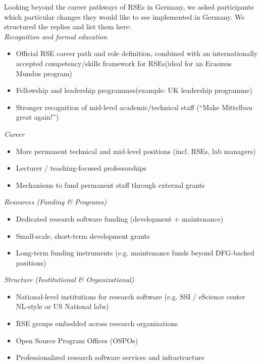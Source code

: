 \documentclass{eceasst}
\begin{document}
Looking beyond the career pathways of RSEs in Germany, we asked participants which particular changes they would like to see implemented in Germany.
We structured the replies and list them here:\\
\emph{Recognition and formal education}\\
\begin{itemize}
 \item Official RSE career path and role definition, combined with an internationally accepted competency/skills framework for RSEs(ideal for an Erasmus Mundus program)
\item Fellowship and leadership programmes(example: UK leadership programme)
\item Stronger recognition of mid-level academic/technical staff (“Make Mittelbau great again!”)
\end{itemize}
\emph{Career}\\
\begin{itemize}
 \item More permanent technical and mid-level positions (incl. RSEs, lab managers)
 \item Lecturer / teaching-focused professorships
 \item Mechanisms to fund permanent staff through external grants
\end{itemize}
\emph{Resources (Funding \& Programs)}\\
\begin{itemize}
 \item Dedicated research software funding (development + maintenance)
 \item Small-scale, short-term development grants
 \item Long-term funding instruments (e.g. maintenance funds beyond DFG-backed positions)
\end{itemize}
\emph{Structure (Institutional \& Organizational)}
\begin{itemize}
 \item National-level institutions for research software (e.g. SSI / eScience center NL-style or US National labs)
 \item RSE groups embedded across research organizations
 \item Open Source Program Offices (OSPOs)
 \item Professionalized research software services and infrastructure
\end{itemize}
\end{document}
